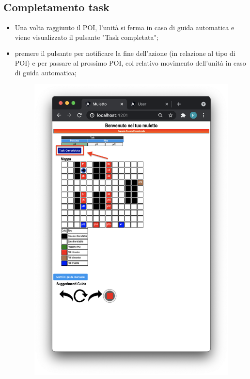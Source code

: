 \subsection{Completamento task}
\begin{itemize}
    \item Una volta raggiunto il POI, l'unità si ferma in caso di guida automatica e viene visualizzato il pulsante "Task completata";
    \item premere il pulsante per notificare la fine dell'azione (in relazione al tipo di POI) e per passare al prossimo POI, col relativo movimento dell'unità in caso di guida automatica;
    \begin{figure}[H]
        \centering
        \includegraphics[scale=0.45]{res/images/forklift_taskcompletata.png}
    \end{figure}

\end{itemize}
